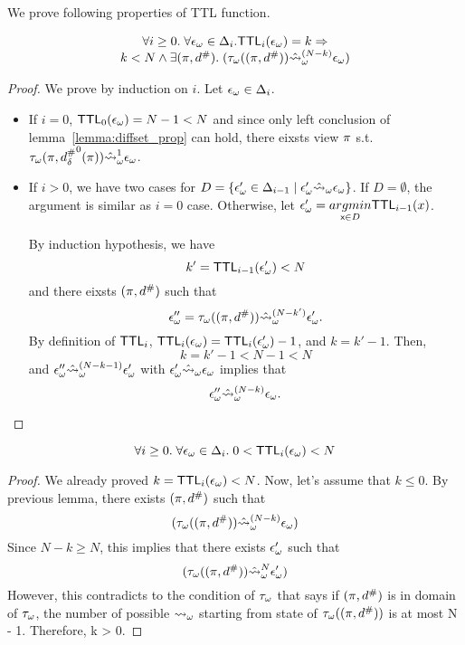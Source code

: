 We prove following properties of TTL function.
\begin{lemma}
  \[
    \begin{array}{c}
      \forall i \geq 0. \; \forall {\epsilon}_\omega \in \Delta_i.
      \textsf{TTL}_i({\epsilon}_\omega) = k \Rightarrow \\
      k < N \wedge
      \exists (\pi, {d}^{\#}). \; ({\tau}_\omega((\pi,{d}^{\#}))
      \hat{\leadsto}_\omega^{(N - k)} {\epsilon}_\omega) \\
    \end{array}
  \]
\end{lemma}
\begin{proof}
  We prove by induction on $i$.
  Let ${\epsilon}_\omega \in \Delta_i$.
  \begin{itemize}
  \item If $i = 0$, $\textsf{TTL}_0({\epsilon}_\omega) = N - 1 < N$
  and since only left conclusion of lemma~\ref{lemma:diffset_prop} can hold,
  there eixsts view $\pi$ s.t.
  ${\tau}_\omega(\pi, {{d}^{\#}_\delta}^0(\pi)) \hat{\leadsto}_\omega^1 {\epsilon}_\omega$.
  \item If $i > 0$, we have two cases for $D = 
    \{{\epsilon}_\omega' \in \Delta_{i-1} \mid {\epsilon}_\omega' \hat{\leadsto}_\omega {\epsilon}_\omega\}$.
  If $D = \emptyset$, the argument is similar as $i = 0$ case.
  Otherwise, let ${\epsilon}_\omega' = \underset{{\textsf{x}} \in D}{argmin}{\textsf{TTL}_{i-1}(x)}$.
  
  By induction hypothesis, we have
  \[
    k' = \textsf{TTL}_{i-1}({\epsilon}_\omega') < N
  \]
  and there eixsts $(\pi, {d}^{\#})$ such that
  \[
    {\epsilon}_\omega'' = {\tau}_\omega((\pi,{d}^{\#})) \hat{\leadsto}_\omega^{(N - k')} {\epsilon}_\omega'.
  \]
  By definition of $\textsf{TTL}_i$,
  $\textsf{TTL}_i({\epsilon}_\omega) = \textsf{TTL}_i({\epsilon}_\omega') - 1$, and $k = k' - 1$.
  Then,
  \[
    k = k' - 1 < N - 1 < N
  \]
  and
  ${\epsilon}_\omega'' \hat{\leadsto}_\omega^{(N - k - 1)} {\epsilon}_\omega'$ with
  ${\epsilon}_\omega' \hat{\leadsto}_\omega {\epsilon}_\omega$ implies that
  \[
    {\epsilon}_\omega'' \hat{\leadsto}_\omega^{(N - k)} {\epsilon}_\omega.
  \]
  \end{itemize}
\end{proof}
\begin{corollary}\label{corollary:ttl-range}
  \[
    \forall i \geq 0. \; \forall {\epsilon}_\omega \in \Delta_i. \;
    0 < \textsf{TTL}_i({\epsilon}_\omega) < N
  \]
\end{corollary}
\begin{proof}
We already proved $k = \textsf{TTL}_i({\epsilon}_\omega) < N$.
Now, let's assume that $k \leq 0$.
By previous lemma, there exists $(\pi, {d}^{\#})$ such that
\[
  ({\tau}_\omega((\pi,{d}^{\#})) \hat{\leadsto}_\omega^{(N - k)} {\epsilon}_\omega)
\]
Since $N - k \geq N$, this implies that there exists ${\epsilon}_\omega'$ such that
\[
  ({\tau}_\omega((\pi,{d}^{\#})) \hat{\leadsto}_\omega^N {\epsilon}_\omega')
\]
However, this contradicts to the condition of ${\tau}_\omega$ that says
if $(\pi,{d}^{\#})$ is in domain of ${\tau}_\omega$,
the number of possible ${\leadsto}_\omega$ starting from state of ${\tau}_\omega((\pi,{d}^{\#}))$
is at most N - 1.
Therefore, k > 0.
\end{proof}


